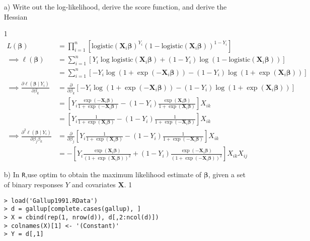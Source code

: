 \documentclass[letterpaper,12pt]{article}
\numberwithin{equation}{section}
\numberwithin{equation}{section}
\newcommand{\solutions}{1}
\begin{document}
\begin{itemize}
\item[a)] Write out the log-likelihood, derive the score function, and derive the Hessian

\if\solutions1
{\color{red}
\begin{align*}
  L(\bm \beta)
  &= \prod_{i=1}^n \left[ \text{logistic}(\bm X_i \bm \beta)^{Y_i} \left(1 - \text{logistic}(\bm X_i \bm \beta)\right)^{1 - Y_i} \right]
  \\
  \implies \ell(\bm \beta)
  &= \sum_{i=1}^n \left[  Y_i \log\text{logistic}(\bm X_i \bm \beta) + (1 - Y_i)\log\left(1 - \text{logistic}(\bm X_i \bm \beta)\right) \right]
  \\
  &= \sum_{i=1}^n \left[ - Y_i \log\left(1 + \exp(-\bm X_i \bm \beta)\right) - (1 - Y_i)\log\left(1 + \exp(\bm X_i \bm \beta)\right) \right]
  \\
  \implies \frac{\partial \ell(\bm \beta \mid Y_i)}{\partial \beta_k}
  &= \frac{\partial }{\partial \beta_k} \left[ - Y_i \log\left(1 + \exp(-\bm X_i \bm \beta)\right) - (1 - Y_i)\log\left(1 + \exp(\bm X_i \bm \beta)\right) \right]
  \\
  &= \left[ Y_i \frac{\exp(-\bm X_i \bm \beta)}{1 + \exp(-\bm X_i \bm \beta)} - (1 - Y_i) \frac{\exp(\bm X_i \bm \beta)}{1 + \exp(\bm X_i \bm \beta)}\right] X_{ik}
  \\
  &= \left[ Y_i \frac{1}{1 + \exp(\bm X_i \bm \beta)} - (1 - Y_i) \frac{1}{1 + \exp(-\bm X_i \bm \beta)}\right] X_{ik}
  \\
  \implies \frac{\partial^2 \ell(\bm \beta \mid Y_i)}{\partial \beta_j \beta_k}
  &= \frac{\partial}{\partial \beta_j} \left[ Y_i \frac{1}{1 + \exp(\bm X_i \bm \beta)} - (1 - Y_i) \frac{1}{1 + \exp(-\bm X_i \bm \beta)}\right] X_{ik}
  \\
  &= -\left[ Y_i \frac{\exp(\bm X_i \bm \beta)}{(1 + \exp(\bm X_i \bm \beta))^2} + (1 - Y_i) \frac{\exp(-\bm X_i \bm \beta)}{(1 + \exp(-\bm X_i \bm \beta))^2}\right] X_{ik} X_{ij}
\end{align*}
}
\fi


\item[b)] In {\tt R},use optim to obtain the maximum likelihood estimate of $\boldsymbol{\beta}$, given a set of binary responses $Y$ and covariates $\boldsymbol{X}$.
\if\solutions1
{\color{red}

\begin{verbatim}
> load('Gallup1991.RData')
> d = gallup[complete.cases(gallup), ] 
> X = cbind(rep(1, nrow(d)), d[,2:ncol(d)]) 
> colnames(X)[1] <- '(Constant)' 
> Y = d[,1] 


\end{verbatim}}
\end{itemize}
\end{document}
